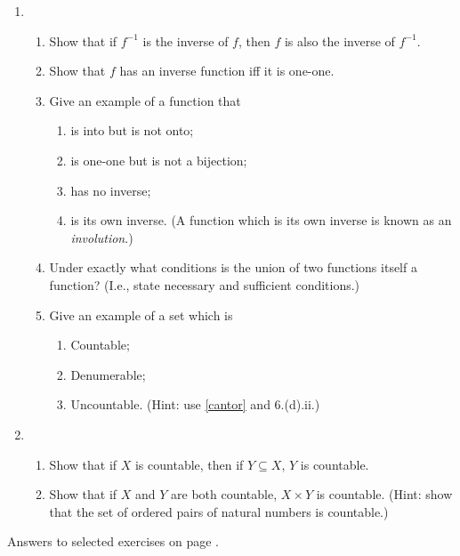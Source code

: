 {\begin{enumerate}
\item \begin{enumerate}
\item Show that if $f^{-1}$ is the inverse of $f$, then $f$ is also the inverse of $f^{-1}$.
	\item Show that $f$ has an inverse function iff it is one-one.
	\item Give an example of a function that \begin{enumerate}
		\item is into but is not onto;
		\item is one-one but is not a bijection;
		\item has no inverse;
		\item is its own inverse. (A function which is its own inverse is known as an \emph{involution}.)
	\end{enumerate}
	\item Under exactly what conditions is the union of two functions itself a function? (I.e., state necessary and sufficient conditions.)
	\item Give an example of a set which is \begin{enumerate}
		\item Countable;
		\item Denumerable;
		\item Uncountable. (Hint: use \autoref{cantor} and 6.(d).ii.)
	\end{enumerate} 
\end{enumerate} 



\item \begin{enumerate}
	\item Show that if $X$ is countable, then if $Y \subseteq X$, $Y$ is countable.
\item Show that if $X$ and $Y$ are both countable, $X \times Y$ is countable. (Hint: show that the set of ordered pairs of natural numbers is countable.)

\end{enumerate}





\end{enumerate}

Answers to selected exercises on page \pageref{ans2}.
}

